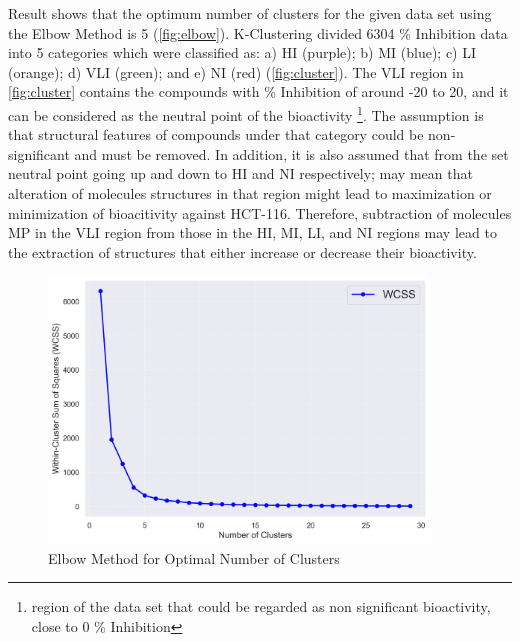 Result shows that the optimum number of clusters for the given data set using the Elbow Method is 5 (\autoref{fig:elbow}). K-Clustering divided 6304 \% Inhibition data into 5 categories which were classified as: a) HI (purple); b) MI (blue); c) LI (orange); d) VLI (green); and e) NI (red) (\autoref{fig:cluster}). The VLI region in \autoref{fig:cluster} contains the compounds with \% Inhibition of around -20 to 20, and it can be considered as the neutral point of the bioactivity \footnote{region of the data set that could be regarded as non significant bioactivity, close to 0 \% Inhibition}. The assumption is that structural features of compounds under that category could be non-significant and must be removed. In addition, it is also assumed that from the set neutral point going up and down to HI and NI respectively; may mean that alteration of molecules structures in that region might lead to maximization or minimization of bioacitivity against HCT-116. Therefore, subtraction of molecules MP in the VLI region from those  in the HI, MI, LI, and NI regions may lead to the extraction of structures that either increase or decrease their bioactivity.        

\begin{figure}[h] %
    \centering
    \includegraphics[width= 0.9\textwidth]{elbow.png} %
    \caption{Elbow Method for Optimal Number of Clusters}
    \label{fig:elbow} %
\end{figure}


